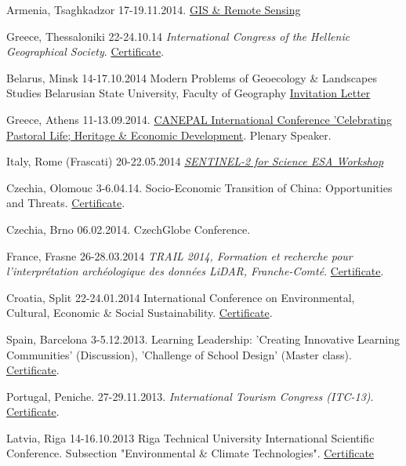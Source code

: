 \documentclass[10pt]{article}
\begin{document}
\begin{etaremune}
	\item	Armenia, Tsaghkadzor 17-19.11.2014.  \href{http://www.geocom.am/Conference/index_conference.htm}{GIS \& Remote Sensing} 		
	\item Greece, Thessaloniki 22-24.10.14 \emph{ International Congress of the Hellenic Geographical Society}. \href{https://drive.google.com/open?id=1ZW460zRhml4pWcQEAz36Lb4AyLkP1O9i}{Certificate}.   				
	\item	Belarus, Minsk 14-17.10.2014  Modern Problems of Geoecology \& Landscapes Studies Belarusian State University, Faculty of Geography \href{https://drive.google.com/open?id=1SV9r3sCw_gkSZAX9OFMTQUXSoxdgrPa-}{Invitation Letter}		
	\item	Greece, Athens 11-13.09.2014. \href{http://canepalconference.wordpress.com/}{CANEPAL International Conference 'Celebrating Pastoral Life; Heritage \& Economic Development}. Plenary Speaker.	
	\item Italy, Rome (Frascati) 20-22.05.2014 \emph{\href{http://seom.esa.int/S2forScience2014/index.php}{SENTINEL-2 for Science ESA Workshop}}			
	\item	Czechia, Olomouc 3-6.04.14. Socio-Economic Transition of China: Opportunities and Threats. \href{https://drive.google.com/open?id=1xCcyg_7t_UR_7LI2OVs-3W5JN1RfTvDb}{Certificate}.							
	\item	Czechia, Brno 06.02.2014. CzechGlobe Conference.
	\item France, Frasne 26-28.03.2014 \emph{TRAIL 2014, Formation et recherche pour l'interpr\'etation arch\'eologique des donn\'ees LiDAR,  Franche-Comt\'{e}}. \href{https://drive.google.com/open?id=1-Tx8qCawFPVtZpjThc3SghWGhBQK-7X-}{Certificate}.
	\item	Croatia, Split 22-24.01.2014  International Conference on Environmental, Cultural, Economic \& Social Sustainability. \href{https://drive.google.com/open?id=1kcPlN3MRb57JhAFF9op1RuKXZRRubVPP}{Certificate}.		
	\item	Spain, Barcelona 3-5.12.2013. Learning Leadership: 'Creating Innovative Learning Communities' (Discussion), 'Challenge of School Design' (Master class). \href{https://drive.google.com/open?id=14TQdhnsq0cSoblaNBmMc3iB7OO7Qp3kY}{Certificate}.	
	\item Portugal, Peniche. 27-29.11.2013. \emph{ International Tourism Congress (ITC-13)}. \href{https://drive.google.com/open?id=1py8pVp4P_pybuK_My5rMUa45GJNnCJk8}{Certificate}.			
	\item	Latvia, Riga 14-16.10.2013 Riga Technical University  International Scientific Conference. Subsection "Environmental \& Climate Technologies". \href{https://drive.google.com/open?id=1wKzXy2Mkmx9O5Z7-TsEEDEQE7xJ3Rj4T}{Certificate}	

\end{etaremune}
\end{document}
